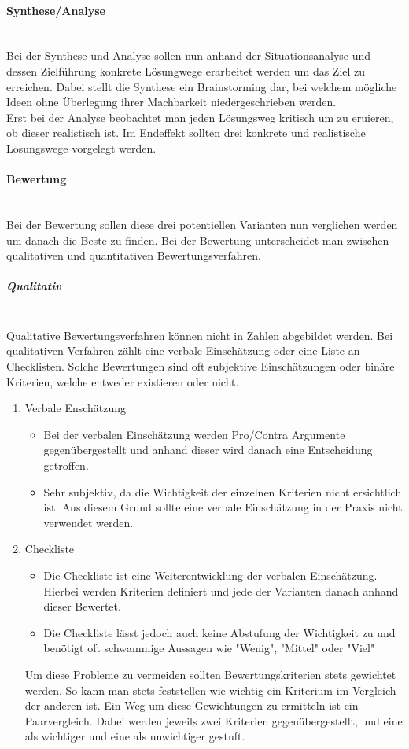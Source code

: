 \documentclass{article}
\newcommand{\paragraphlb}[1]{\paragraph{#1}\mbox{}\\}
\newcommand{\subparagraphlb}[1]{\subparagraph{#1}\mbox{}\\}
\begin{document}
	\paragraphlb{Synthese/Analyse}
	Bei der Synthese und Analyse sollen nun anhand der Situationsanalyse und dessen Zielführung konkrete Lösungwege erarbeitet werden um das Ziel zu erreichen. Dabei stellt die Synthese ein Brainstorming dar, bei welchem mögliche Ideen ohne Überlegung ihrer Machbarkeit niedergeschrieben werden. \\
	Erst bei der Analyse beobachtet man jeden Lösungsweg kritisch um zu eruieren, ob dieser realistisch ist. Im Endeffekt sollten drei konkrete und realistische Lösungswege vorgelegt werden.
	\paragraphlb{Bewertung}
	Bei der Bewertung sollen diese drei potentiellen Varianten nun verglichen werden um danach die Beste zu finden. Bei der Bewertung unterscheidet man zwischen qualitativen und quantitativen Bewertungsverfahren.
	\subparagraphlb{Qualitativ}
	Qualitative Bewertungsverfahren können nicht in Zahlen abgebildet werden. Bei qualitativen Verfahren zählt eine verbale Einschätzung oder eine Liste an Checklisten. Solche Bewertungen sind oft subjektive Einschätzungen oder binäre Kriterien, welche entweder existieren oder nicht.
	\begin{enumerate}
		\item{Verbale Enschätzung}
		\begin{itemize}
			\item{Bei der verbalen Einschätzung werden Pro/Contra Argumente gegenübergestellt und anhand dieser wird danach eine Entscheidung getroffen.}
			\item{Sehr subjektiv, da die Wichtigkeit der einzelnen Kriterien nicht ersichtlich ist. Aus diesem Grund sollte eine verbale Einschätzung in der Praxis nicht verwendet werden.}
		\end{itemize}
		\item{Checkliste}
		\begin{itemize}
			\item{Die Checkliste ist eine Weiterentwicklung der verbalen Einschätzung. Hierbei werden Kriterien definiert und jede der Varianten danach anhand dieser Bewertet.}
			\item{Die Checkliste lässt jedoch auch keine Abstufung der Wichtigkeit zu und benötigt oft schwammige Aussagen wie "Wenig", "Mittel" oder "Viel"}
		\end{itemize}
		Um diese Probleme zu vermeiden sollten Bewertungskriterien stets gewichtet werden. So kann man stets feststellen wie wichtig ein Kriterium im Vergleich der anderen ist. Ein Weg um diese Gewichtungen zu ermitteln ist ein Paarvergleich. Dabei werden jeweils zwei Kriterien gegenübergestellt, und eine als wichtiger und eine als unwichtiger gestuft.
	\end{enumerate}
\end{document}
